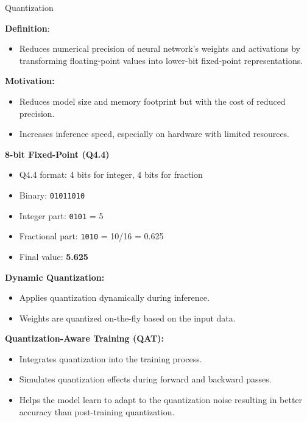 \documentclass[aspectratio=169,xcolor=dvipsnames]{beamer}
\newcommand{\vtab}{\vspace{0.3cm}}
\begin{document}
\begin{frame}[allowframebreaks]{Quantization}
    \begin{minipage}{0.58\textwidth}
        \textbf{Definition}:
        \begin{itemize}
            \item Reduces numerical precision of neural network's weights and activations by transforming floating-point values into lower-bit fixed-point representations.
        \end{itemize}
        \vtab
        \textbf{Motivation:}
        \begin{itemize}
            \item Reduces model size and memory footprint but with the cost of reduced precision.
            \item Increases inference speed, especially on hardware with limited resources.
        \end{itemize}
    \end{minipage}
    \hfill
    \begin{minipage}{0.4\textwidth}
        \begin{examples}
        \footnotesize
        \textbf{8-bit Fixed-Point (Q4.4)}
            \begin{itemize}
                \item Q4.4 format: 4 bits for integer, 4 bits for fraction
                \item Binary: \texttt{01011010}
                \item Integer part: \texttt{0101} = 5
                \item Fractional part: \texttt{1010} = 10/16 = 0.625
                \item Final value: \textbf{5.625}
            \end{itemize}
        \end{examples}
    \end{minipage}
    
    \framebreak
    \textbf{Dynamic Quantization:}
    \begin{itemize}
        \item Applies quantization dynamically during inference.
        \item Weights are quantized on-the-fly based on the input data.
    \end{itemize}
    \vtab
    \textbf{Quantization-Aware Training (QAT):}
    \begin{itemize}
        \item Integrates quantization into the training process.
        \item Simulates quantization effects during forward and backward passes.
        \item Helps the model learn to adapt to the quantization noise resulting in better accuracy than post-training quantization.
    \end{itemize}
\end{frame}
\end{document}
